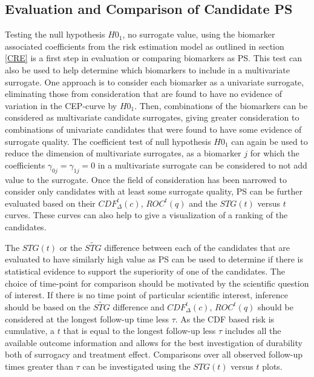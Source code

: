 \documentclass[times, doublespace]{simauth}
\begin{document}
\subsection{Evaluation and Comparison of Candidate PS} \label{DEF}
Testing the null hypothesis $H0_1$, no surrogate value, using the biomarker associated coefficients from the risk estimation model as outlined in section \ref{CRE} is a first step in evaluation or comparing biomarkers as PS.  This test can also be used to help determine which biomarkers to include in a multivariate surrogate. One approach is to consider each biomarker as a univariate surrogate, eliminating those from consideration that are found to have no evidence of variation in the CEP-curve by $H0_1$. Then, combinations of the biomarkers can be considered as multivariate candidate surrogates, giving greater consideration to combinations of univariate candidates that were found to have some evidence of surrogate quality. The coefficient test of  null hypothesis $H0_1$ can again be used to reduce the dimension of multivariate surrogates, as a biomarker $j$ for which the coefficients $\gamma_{0j}=\gamma_{1j}=0$ in a multivariate surrogate can be considered to not add value to the surrogate. Once the field of consideration has been narrowed to consider only candidates with at least some surrogate quality, PS can be further evaluated based on their $CDF^{t}_{\Delta}(c)$, $ROC^{t}(q)$ and the $STG(t)$ versus $t$ curves. These curves can also help to give a visualization of a ranking of the candidates. 

The $STG(t)$ or the $\widetilde{STG}$ difference between each of the candidates that are evaluated to have similarly high value as PS can be used to determine if there is statistical evidence to support the superiority of one of the candidates. The choice of time-point for comparison should be motivated by the scientific question of interest. If there is no time point of particular scientific interest, inference should be based on the $\widetilde{STG}$ difference and $CDF^{t}_{\Delta}(c)$, $ROC^{t}(q)$ should be considered at the longest follow-up time less $\tau$. As the CDF based risk is cumulative, a $t$ that is equal to the longest follow-up less $\tau$ includes all the available outcome information and allows for the best investigation of durability both of surrogacy and treatment effect. Comparisons over all observed follow-up times greater than $\tau$ can be investigated using the $STG(t)$ versus $t$ plots.
\end{document}
